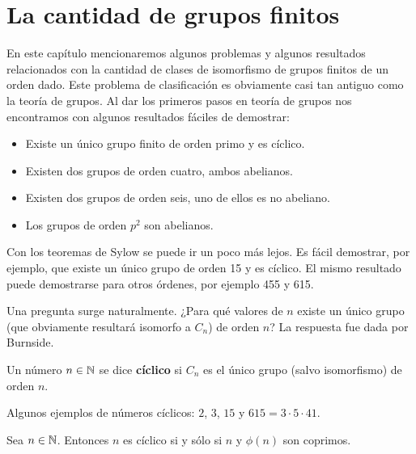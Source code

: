 \chapter{La cantidad de grupos finitos}

En este capítulo mencionaremos algunos problemas y algunos resultados relacionados con la
cantidad de clases de isomorfismo de grupos finitos de un orden dado. 
Este problema de clasificación 
es obviamente casi tan antiguo como la teoría de grupos. Al dar los primeros pasos en teoría de grupos
nos encontramos con algunos resultados fáciles de demostrar:
\begin{itemize}
    \item Existe un único grupo finito de orden primo y es cíclico. 
    \item Existen dos grupos de orden cuatro, ambos abelianos. 
    \item Existen dos grupos de orden seis, uno de ellos es no abeliano. 
    \item Los grupos de orden $p^2$ son abelianos. 
\end{itemize}

Con los teoremas de Sylow se puede ir un poco más lejos. Es fácil demostrar, por ejemplo,
que existe un único grupo de orden 15 y es cíclico. El mismo resultado puede
demostrarse para otros órdenes, por ejemplo 455 y 615. 

Una pregunta surge naturalmente. ¿Para qué valores de $n$ 
existe un único grupo (que obviamente resultará isomorfo a $C_n$) de orden $n$? 
La respuesta fue dada por Burnside. 

\begin{definition}
Un número $n\in\mathbb{N}$ 
se dice \textbf{cíclico} si $C_n$ es el único grupo (salvo isomorfismo) de
orden $n$.
\end{definition}

Algunos ejemplos de números cíclicos: $2$, $3$, $15$ y 
$615=3\cdot 5\cdot 41$. 

\begin{theorem}[Burnside]
	Sea $n\in\mathbb{N}$. Entonces $n$ es cíclico si y sólo si 
	$n$ y $\phi(n)$ son coprimos.
\end{theorem}

